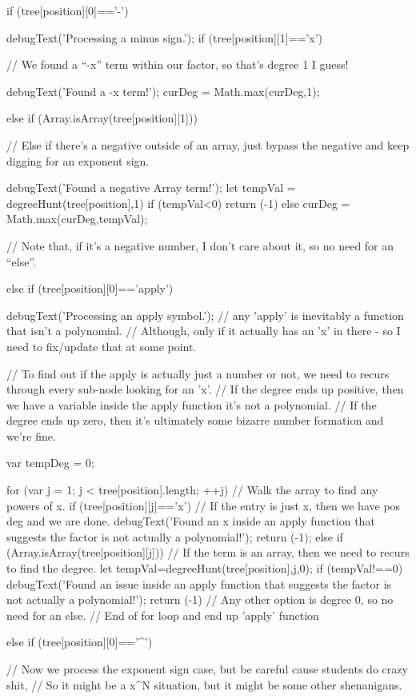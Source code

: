 \documentclass{ximera}
\begin{document}
\begin{javascript}
{    if (tree[position][0]=='-') {
        debugText('Processing a minus sign.');
        if (tree[position][1]=='x') {
            // We found a ``-x'' term within our factor, so that's degree 1 I guess!
             
            debugText('Found a -x term!');
            curDeg = Math.max(curDeg,1);
             
        } else if (Array.isArray(tree[position][1])) {
            // Else if there's a negative outside of an array, just bypass the negative and keep digging for an exponent sign.
             
            debugText('Found a negative Array term!');
            let tempVal = degreeHunt(tree[position],1)
            if (tempVal<0) { return (-1)} else {
                curDeg = Math.max(curDeg,tempVal);
            }
             
             
        }// Note that, if it's a negative number, I don't care about it, so no need for an ``else''.
    } else if (tree[position][0]=='apply') {
        debugText('Processing an apply symbol.');
        // any 'apply' is inevitably a function that isn't a polynomial.
        //  Although, only if it actually has an 'x' in there - so I need to fix/update that at some point.
         
        // To find out if the apply is actually just a number or not, we need to recurs through every sub-node looking for an 'x'.
        //  If the degree ends up positive, then we have a variable inside the apply function it's not a polynomial.
        //  If the degree ends up zero, then it's ultimately some bizarre number formation and we're fine.
         
        var tempDeg = 0;
         
        for (var j = 1; j < tree[position].length; ++j) {
            // Walk the array to find any powers of x.
            if (tree[position][j]=='x') {
                // If the entry is just x, then we have pos deg and we are done.
                debugText('Found an x inside an apply function that suggests the factor is not actually a polynomial!');
                return (-1);
            } else if (Array.isArray(tree[position][j])) {
                // If the term is an array, then we need to recurs to find the degree.
                let tempVal=degreeHunt(tree[position],j,0);
                if (tempVal!==0) {
                    debugText('Found an issue inside an apply function that suggests the factor is not actually a polynomial!');
                    return (-1)
                }
            }// Any other option is degree 0, so no need for an else.
        }// End of for loop and end up 'apply' function
    } else if (tree[position][0]=='^') {
        // Now we process the exponent sign case, but be careful cause students do crazy shit,
        //  So it might be a x^N situation, but it might be some other shenanigans.
         
}}
\end{javascript}
\end{document}
